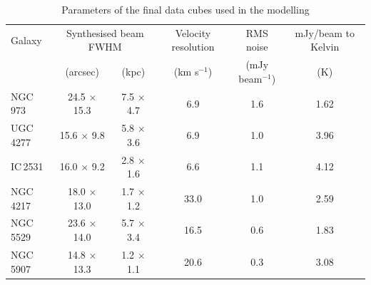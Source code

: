 \documentclass{aa}
\begin{document}
\begin{table}[t]
\caption{Parameters of the final data cubes used in the modelling}
\label{table:cubes}
\centering
\begin{tabular}{l c c c c c}
\hline \hline\noalign{\smallskip}
Galaxy & \multicolumn{2}{c}{Synthesised beam FWHM} & Velocity resolution & RMS noise & mJy/beam to Kelvin \\
 & (arcsec) & (kpc) & (km s$^{-1}$) & (mJy beam$^{-1}$) & (K) \\
\hline\noalign{\smallskip}
NGC\,973 & 24.5 $\times$ 15.3 & 7.5 $\times$ 4.7 & 6.9 & 1.6 & 1.62\\ %
UGC\,4277 & 15.6 $\times$ 9.8 & 5.8 $\times$ 3.6 & 6.9 & 1.0 & 3.96\\ %
IC\,2531 & 16.0 $\times$ 9.2 & 2.8 $\times$ 1.6 & 6.6 & 1.1 & 4.12\\ %
NGC\,4217 & 18.0 $\times$ 13.0 & 1.7 $\times$ 1.2 & 33.0 & 1.0 & 2.59\\ %
NGC\,5529 & 23.6 $\times$ 14.0 & 5.7 $\times$ 3.4 & 16.5 & 0.6 & 1.83\\ %
NGC\,5907 & 14.8 $\times$ 13.3 & 1.2 $\times$ 1.1 & 20.6 & 0.3 & 3.08\\ %
\hline
\end{tabular}
\end{table}
\end{document}

